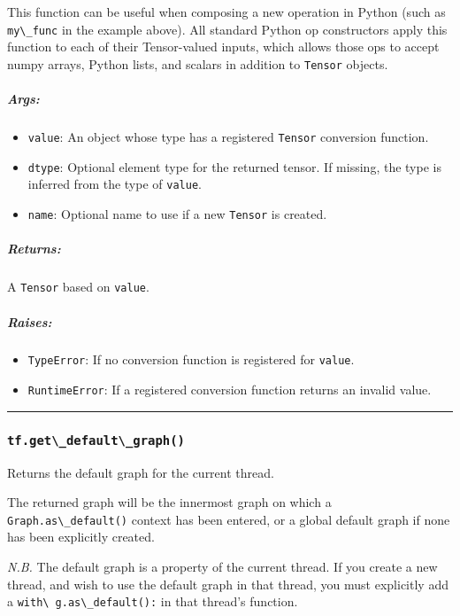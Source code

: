 This function can be useful when composing a new operation in Python
(such as \lstinline{my\_func} in the example above). All standard Python op
constructors apply this function to each of their Tensor-valued inputs,
which allows those ops to accept numpy arrays, Python lists, and scalars
in addition to \lstinline{Tensor} objects.

\subparagraph{Args: }\label{args-24}

\begin{itemize}
\tightlist
\item
  \lstinline{value}: An object whose type has a registered \lstinline{Tensor}
  conversion function.
\item
  \lstinline{dtype}: Optional element type for the returned tensor. If
  missing, the type is inferred from the type of \lstinline{value}.
\item
  \lstinline{name}: Optional name to use if a new \lstinline{Tensor} is
  created.
\end{itemize}

\subparagraph{Returns: }\label{returns-27}

A \lstinline{Tensor} based on \lstinline{value}.

\subparagraph{Raises: }\label{raises-14}

\begin{itemize}
\tightlist
\item
  \lstinline{TypeError}: If no conversion function is registered for
  \lstinline{value}.
\item
  \lstinline{RuntimeError}: If a registered conversion function returns an
  invalid value.
\end{itemize}

\begin{center}\rule{0.5\linewidth}{\linethickness}\end{center}

\subsubsection{\texorpdfstring{\lstinline{tf.get\_default\_graph()}
}{tf.get\_default\_graph() }}\label{tf.getux5fdefaultux5fgraph}

Returns the default graph for the current thread.

The returned graph will be the innermost graph on which a
\lstinline{Graph.as\_default()} context has been entered, or a global
default graph if none has been explicitly created.

\emph{N.B.} The default graph is a property of the current thread. If
you create a new thread, and wish to use the default graph in that
thread, you must explicitly add a \lstinline{with\ g.as\_default():} in
that thread's function.

